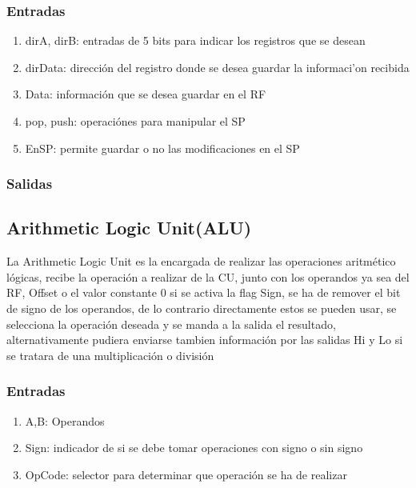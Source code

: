 \documentclass{article}
\begin{document}
            \subsubsection{Entradas}
            \begin{enumerate}
                \item dirA, dirB: entradas de 5 bits para indicar los registros que se desean
                \item dirData: direcci\'on del registro donde se desea guardar la informaci'on recibida
                \item Data: informaci\'on que se desea guardar en el RF
                \item pop, push: operaci\'ones para manipular el SP
                \item EnSP: permite guardar o no las modificaciones en el SP
            \end{enumerate}
            \subsubsection{Salidas}

        \subsection{Arithmetic Logic Unit(ALU)}
        \label{sec:ALU}        
            La Arithmetic Logic Unit es la encargada de realizar las operaciones aritm\'etico l\'ogicas, recibe la operaci\'on a realizar de la CU, junto con los operandos ya sea del RF, Offset o el valor constante 0
             si se activa la flag Sign, se ha de remover el bit de signo de los operandos, de lo contrario directamente estos se pueden usar, se selecciona la operaci\'on deseada y se manda a la salida el resultado, alternativamente pudiera enviarse tambien 
             informaci\'on por las salidas Hi y Lo si se tratara de una multiplicaci\'on o divisi\'on
            \subsubsection{Entradas}
            \begin{enumerate}
                \item A,B: Operandos
                \item Sign: indicador de si se debe tomar operaciones con signo o sin signo
                \item OpCode: selector para determinar que operaci\'on se ha de realizar
            \end{enumerate}
\end{document}
